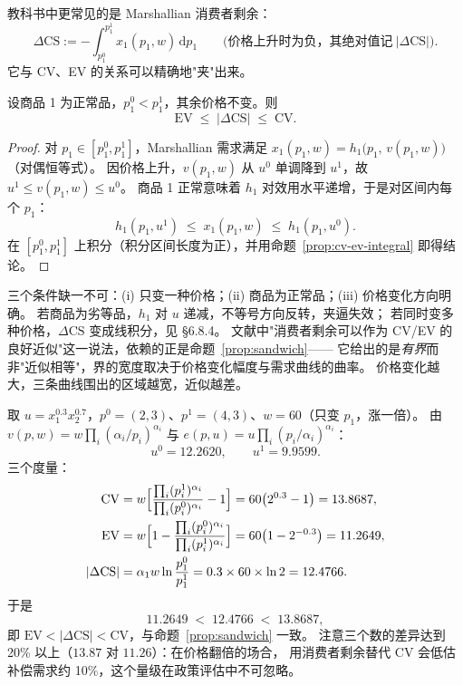 教科书中更常见的是 Marshallian 消费者剩余：
\[
 \Delta\mathrm{CS}:=-\int_{p^0_1}^{p^1_1}x_1(p_1,w)\,\mathrm dp_1
 \qquad\bigl(\text{价格上升时为负，其绝对值记}\ |\Delta\mathrm{CS}|\bigr).
\]
它与 CV、EV 的关系可以精确地"夹"出来。

\begin{proposition}[夹逼]\label{prop:sandwich}
设商品 1 为正常品，$p^0_1<p^1_1$，其余价格不变。则
\[
 \boxed{\;\mathrm{EV}\;\le\;|\Delta\mathrm{CS}|\;\le\;\mathrm{CV}.\;}
\]
\end{proposition}

\begin{proof}
对 $p_1\in[p^0_1,p^1_1]$，Marshallian 需求满足
$x_1(p_1,w)=h_1\bigl(p_1,\,v(p_1,w)\bigr)$（对偶恒等式）。
因价格上升，$v(p_1,w)$ 从 $u^0$ 单调降到 $u^1$，故 $u^1\le v(p_1,w)\le u^0$。
商品 1 正常意味着 $h_1$ 对效用水平递增，于是对区间内每个 $p_1$：
\[
 h_1(p_1,u^1)\;\le\;x_1(p_1,w)\;\le\;h_1(p_1,u^0).
\]
在 $[p^0_1,p^1_1]$ 上积分（积分区间长度为正），并用命题~\ref{prop:cv-ev-integral} 即得结论。
\end{proof}

\begin{remark}[夹逼的适用范围]
三个条件缺一不可：(i) 只变一种价格；(ii) 商品为正常品；(iii) 价格变化方向明确。
若商品为劣等品，$h_1$ 对 $u$ 递减，不等号方向反转，夹逼失效；
若同时变多种价格，$\Delta\mathrm{CS}$ 变成线积分，见 \S 6.8.4。
文献中"消费者剩余可以作为 CV/EV 的良好近似"这一说法，依赖的正是命题~\ref{prop:sandwich}——
它给出的是\emph{有界}而非"近似相等"，界的宽度取决于价格变化幅度与需求曲线的曲率。
价格变化越大，三条曲线围出的区域越宽，近似越差。
\end{remark}

\begin{example}[CD 情形：三个数都能算出来]\label{ex:cd-welfare}
取 $u=x_1^{0.3}x_2^{0.7}$，$p^0=(2,3)$、$p^1=(4,3)$、$w=60$（只变 $p_1$，涨一倍）。
由 $v(p,w)=w\prod_i(\alpha_i/p_i)^{\alpha_i}$ 与 $e(p,u)=u\prod_i(p_i/\alpha_i)^{\alpha_i}$：
\[
 u^0=12.2620,\qquad u^1=9.9599 .
\]
三个度量：
\begin{align*}
\mathrm{CV}&=w\Bigl[\frac{\prod_i(p_i^1)^{\alpha_i}}{\prod_i(p_i^0)^{\alpha_i}}-1\Bigr]
 =60\bigl(2^{0.3}-1\bigr)=13.8687,\\
\mathrm{EV}&=w\Bigl[1-\frac{\prod_i(p_i^0)^{\alpha_i}}{\prod_i(p_i^1)^{\alpha_i}}\Bigr]
 =60\bigl(1-2^{-0.3}\bigr)=11.2649,\\
|\Delta\mathrm{CS}|&=\alpha_1w\ln\frac{p^0_1}{p^1_1}=0.3\times60\times\ln2=12.4766 .
\end{align*}
于是
\[
 11.2649\;<\;12.4766\;<\;13.8687,
\]
即 $\mathrm{EV}<|\Delta\mathrm{CS}|<\mathrm{CV}$，与命题~\ref{prop:sandwich} 一致。
注意三个数的差异达到 20\% 以上（$13.87$ 对 $11.26$）：在价格翻倍的场合，
用消费者剩余替代 CV 会低估补偿需求约 10\%，这个量级在政策评估中不可忽略。
\end{example}

